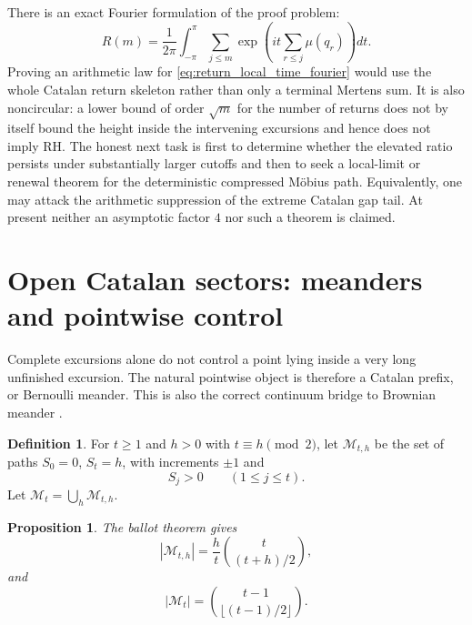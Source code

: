 \documentclass[11pt]{amsart}
\numberwithin{equation}{section}
\theoremstyle{plain}
\newtheorem{proposition}[theorem]{Proposition}
\theoremstyle{definition}
\newtheorem{definition}[theorem]{Definition}
\theoremstyle{remark}
\newcommand{\Mob}{\mu}
\begin{document}
There is an exact Fourier formulation of the proof problem:
\begin{equation}
 \boxed{\quad
 R(m)=\frac1{2\pi}\int_{-\pi}^{\pi}
 \sum_{j\leq m}\exp\!\left(it\sum_{r\leq j}\Mob(q_r)\right)dt.
 \quad}
\label{eq:return_local_time_fourier}
\end{equation}
Proving an arithmetic law for \eqref{eq:return_local_time_fourier} would use
the whole Catalan return skeleton rather than only a terminal Mertens sum.
It is also noncircular: a lower bound of order $\sqrt m$ for the number of
returns does not by itself bound the height inside the intervening excursions
and hence does not imply RH.  The honest next task is first to determine
whether the elevated ratio persists under substantially larger cutoffs and
then to seek a local-limit or renewal theorem for the deterministic compressed
M\"obius path.  Equivalently, one may attack the arithmetic suppression of the
extreme Catalan gap tail.  At present neither an asymptotic factor $4$ nor such
a theorem is claimed.

\section{Open Catalan sectors: meanders and pointwise control}
\label{sec:meanders}

Complete excursions alone do not control a point lying inside a very long unfinished excursion.  The natural pointwise object is therefore a Catalan prefix, or Bernoulli meander.  This is also the correct continuum bridge to Brownian meander \cite{DurrettIglehartMiller1977,CsakiMohanty1981}.

\begin{definition}
\label{def:positive_meander}
For $t\ge1$ and $h>0$ with $t\equiv h\pmod 2$, let $\mathcal{M}_{t,h}$ be the set of paths $S_0=0$, $S_t=h$, with increments $\pm1$ and
\begin{equation}
S_j>0\qquad (1\le j\le t).
\label{eq:strict_meander_condition}
\end{equation}
Let $\mathcal{M}_t=\bigcup_h\mathcal{M}_{t,h}$.
\end{definition}

\begin{proposition}
\label{prop:ballot_meander_count}
The ballot theorem gives
\begin{equation}
\left|\mathcal{M}_{t,h}\right|
=
\frac{h}{t}
\binom{t}{(t+h)/2},
\label{eq:ballot_endpoint_count}
\end{equation}
and
\begin{equation}
\left|\mathcal{M}_t\right|
=
\binom{t-1}{\lfloor (t-1)/2\rfloor}.
\label{eq:total_meander_count}
\end{equation}
\end{proposition}
\end{document}
